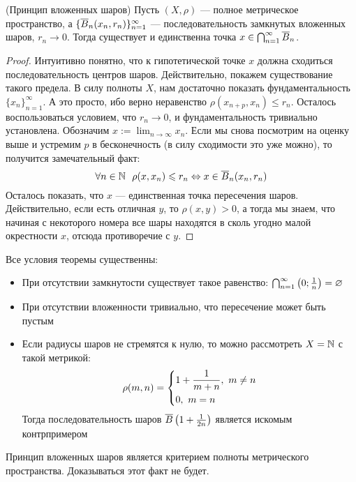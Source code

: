 \begin{theorem} (Принцип вложенных шаров)
	Пусть $(X, \rho)$ --- полное метрическое пространство, а $\{\overline{B}_n(x_n, r_n)\}_{n = 1}^\infty$ --- последовательность замкнутых вложенных шаров, $r_n \to 0$. Тогда существует и единственна точка $x \in \bigcap_{n = 1}^\infty \overline{B}_n$.
\end{theorem}

\begin{proof}
	Интуитивно понятно, что к гипотетической точке $x$ должна сходиться последовательность центров шаров. Действительно, покажем существование такого предела. В силу полноты $X$, нам достаточно показать фундаментальность $\{x_n\}_{n = 1}^\infty$. А это просто, ибо верно неравенство $\rho(x_{n + p}, x_n) \le r_n$. Осталось воспользоваться условием, что $r_n \to 0$, и фундаментальность тривиально установлена. Обозначим $x := \lim_{n \to \infty} x_n$. Если мы снова посмотрим на оценку выше и устремим $p$ в бесконечность (в силу сходимости это уже можно), то получится замечательный факт:
	\[
		\forall n \in \N\ \ \rho(x, x_n) \le r_n \Lra x \in \ole{B}_n(x_n, r_n)
	\]
	Осталось показать, что $x$ --- единственная точка пересечения шаров. Действительно, если есть отличная $y$, то $\rho(x, y) > 0$, а тогда мы знаем, что начиная с некоторого номера все шары находятся в сколь угодно малой окрестности $x$, отсюда противоречие с $y$.
\end{proof}

\begin{note}
	Все условия теоремы существенны:
	\begin{itemize}
		\item При отсутствии замкнутости существует такое равенство: $\bigcap_{n = 1}^\infty \left(0; \frac{1}{n}\right) = \varnothing$
		
		\item При отсутствии вложенности тривиально, что пересечение может быть пустым
		
		\item Если радиусы шаров не стремятся к нулю, то можно рассмотреть $X = \mathbb{N}$ с такой метрикой:
		\[
			\rho(m, n) = \left\{ \begin{aligned} 
				&{1 + \frac{1}{m + n},\ m \neq n}
				\\
				&{0,\ m = n}
			 \end{aligned} \right.
		\]
		Тогда последовательность шаров $\overline{B}\left(1 + \frac{1}{2n}\right)$ является искомым контрпримером
	\end{itemize}
\end{note}

\begin{note}
	Принцип вложенных шаров является критерием полноты метрического пространства. Доказываться этот факт не будет.
\end{note}


